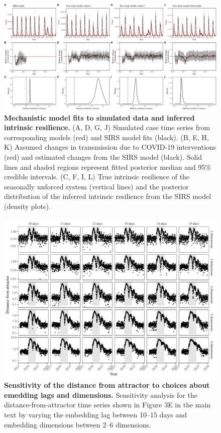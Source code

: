 \documentclass[12pt]{article}
\begin{document}
\begin{figure}[!th]
\includegraphics[width=\textwidth]{../figure_fit/figure_fit.pdf}
\caption{
\textbf{Mechanistic model fits to simulated data and inferred intrinsic resilience.}
(A, D, G, J) Simulated case time series from corresponding models (red) and SIRS model fits (black).
(B, E, H, K) Assumed changes in transmission due to COVID-19 interventions (red) and estimated changes from the SIRS model (black).
Solid lines and shaded regions represent fitted posterior median and 95\% credible intervals.
(C, F, I, L) True intrinsic resilience of the seasonally unforced system (vertical lines) and the posterior distribution of the inferred intrinsic resilience from the SIRS model (density plots).
}
\end{figure}


\pagebreak

\begin{figure}[!th]
\includegraphics[width=\textwidth]{../figure3/figure3_sens.pdf}
\caption{
\textbf{Sensitivity of the distance from attractor to choices about emedding lags and dimensions.}
Sensitivity analysis for the distance-from-attractor time series shown in Figure 3E in the main text by varying the embedding lag between 10--15 days and embedding dimensions between 2--6 dimensions.
}
\end{figure}
\end{document}
